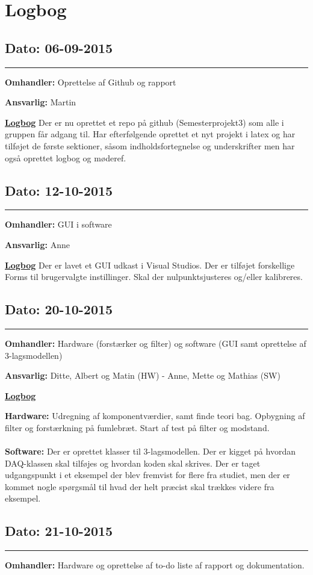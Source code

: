 \chapter{Logbog}

\section{Dato: 06-09-2015}
\hrule
\textbf{Omhandler:} Oprettelse af Github og rapport

\textbf{Ansvarlig:} Martin

\underline{\textbf{Logbog}}
Der er nu oprettet et repo på github (Semesterprojekt3) som alle i gruppen får adgang til. Har efterfølgende oprettet et nyt projekt i latex og har tilføjet de første sektioner, såsom indholdsfortegnelse og underskrifter men har også oprettet logbog og møderef.

\section{Dato: 12-10-2015}
\hrule
\textbf{Omhandler:} GUI i software 

\textbf{Ansvarlig:} Anne

\underline{\textbf{Logbog}}
Der er lavet et GUI udkast i Visual Studios. Der er tilføjet forskellige Forms til brugervalgte instillinger. Skal der nulpunktsjusteres og/eller kalibreres.

\section{Dato: 20-10-2015}
\hrule
\textbf{Omhandler:} Hardware (forstærker og filter) og software (GUI samt oprettelse af 3-lagsmodellen) 

\textbf{Ansvarlig:} Ditte, Albert og Matin (HW) - Anne, Mette og Mathias (SW)

\underline{\textbf{Logbog}}

\textbf{Hardware:} Udregning af komponentværdier, samt finde teori bag. Opbygning af filter og forstærkning på fumlebræt. Start af test på filter og modstand. \\
\\ 
\textbf{Software:} Der er oprettet klasser til 3-lagsmodellen. Der er kigget på hvordan DAQ-klassen skal tilføjes og hvordan koden skal skrives. Der er taget udgangspunkt i et eksempel der blev fremvist for flere fra studiet, men der er kommet nogle spørgsmål til hvad der helt præcist skal trækkes videre fra eksempel.
\newpage
\section{Dato: 21-10-2015}
\hrule
\textbf{Omhandler:} Hardware og oprettelse af to-do liste af rapport og dokumentation.

